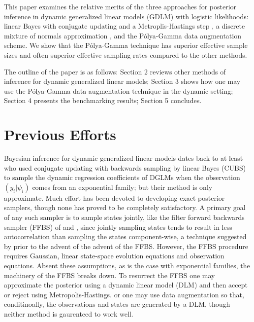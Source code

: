 \documentclass[11pt]{article}
\newcommand{\Polya}{P\'{o}lya}
\begin{document}
This paper examines the relative merits of the three approaches for posterior
inference in dynamic generalized linear models (GDLM) with logistic likelihoods:
linear Bayes with conjugate updating and a Metroplis-Hastings step
\citep{ravines-etal-2006}, a discrete mixture of normals approximation
\citep{fruhwirth-schnatter-etal-2009, fussl-etal-2013}, and the \Polya-Gamma
data augmentation scheme.  We show that the \Polya-Gamma technique has superior
effective sample sizes and often superior effective sampling rates compared to
the other methods.

The outline of the paper is as follows: Section 2 reviews other methods of
inference for dynamic generalized linear models; Section 3 shows how one may use
the \Polya-Gamma data augmentation technique in the dynamic setting; Section 4
presents the benchmarking results; Section 5 concludes.

\section{Previous Efforts}

Bayesian inference for dynamic generalized linear models dates back to at least
\cite{west-etal-1985} who used conjugate updating with backwards sampling by
linear Bayes (CUBS) to sample the dynamic regression coefficients of DGLMs when
the observation $(y_i | \psi_i)$ comes from an exponential family; but their
method is only approximate.  Much effort has been devoted to developing exact
posterior samplers, though none has proved to be completely satisfactory.  A
primary goal of any such sampler is to sample states jointly, like the filter
forward backwards sampler (FFBS) of \cite{fruhwirth-schnatter-1994} and
\cite{carter-kohn-1994}, since jointly sampling states tends to result in less
autocorrelation than sampling the states component-wise, a technique suggested
by \cite{carlin-etal-1992} prior to the advent of the advent of the FFBS.
However, the FFBS procedure requires Gaussian, linear state-space evolution
equations and observation equations.  Absent these assumptions, as is the case
with exponential families, the machinery of the FFBS breaks down.  To resurrect
the FFBS one may approximate the posterior using a dynamic linear model (DLM)
and then accept or reject using Metropolis-Hastings. or one may use data
augmentation so that, conditinoally, the observations and states are generated
by a DLM, though neither method is gaurenteed to work well.
\end{document}
